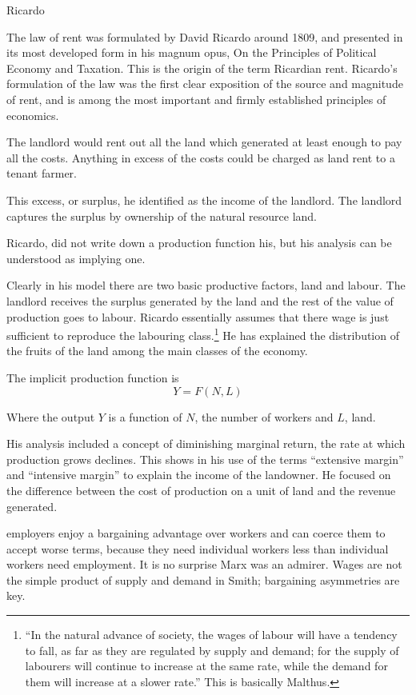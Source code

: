 Ricardo

The law of rent was formulated by David Ricardo around 1809, and presented in its most developed form in his magnum opus, On the Principles of Political Economy and Taxation. This is the origin of the term Ricardian rent. Ricardo's formulation of the law was the first clear exposition of the source and magnitude of rent, and is among the most important and firmly established principles of economics.

The landlord would rent out all the land which generated at least enough to pay all the costs. Anything in excess of the costs could be charged as land rent to a tenant farmer.

This excess, or surplus, he identified as the income of the landlord. The landlord captures the surplus by ownership of the natural resource land. 

Ricardo, did not write down a production function his, but his analysis can be understood as implying one.

Clearly in his model there are two basic productive factors, land and labour. The landlord  receives the surplus generated by the land and the rest of the value of production goes to labour. Ricardo essentially assumes that there wage is  just sufficient to reproduce the labouring class.\footnote{``In the natural advance of society, the wages of labour will have a tendency to fall, as far as they are regulated by supply and demand; for the supply of labourers will continue to increase at the same rate, while the demand for them will increase at a slower rate.''  This is  basically Malthus.} He has explained the distribution of the fruits of the land among the main classes of the economy.

The implicit production function is
\[Y=F(N, L)\]

Where the output $Y$ is a function of $N$, the number of workers and $L$, land.

His analysis included a concept of diminishing marginal return, the rate at which production grows declines. 
This shows in his use of the terms ``extensive margin'' and ``intensive margin'' to explain the income of the landowner. He focused on the difference between the cost of production on a unit of land and the revenue generated. 



employers enjoy a bargaining advantage over workers and can coerce them to accept worse terms, because they need individual workers less than individual workers need employment. It is no surprise Marx was an admirer. Wages are not the simple product of supply and demand in Smith; bargaining asymmetries are key.

